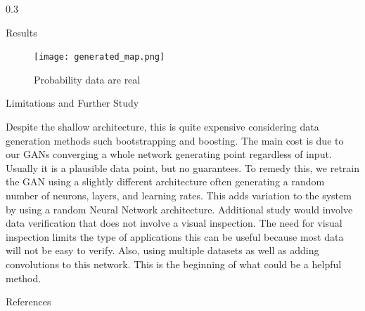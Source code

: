 \documentclass{msuposter}
\newcommand{\colwidth}{0.3\linewidth}
\begin{document}
\begin{frame}{}
\begin{columns}[t]
\begin{column}{\colwidth}
\begin{block}{Results}
\begin{figure}
  \texttt{[image: generated\_map.png]}
  	\caption{\label{fig:my-label} Probability data are real}
\end{figure} 


\end{block}


\begin{block}{Limitations and Further Study}

Despite the shallow architecture, this is quite expensive considering data generation methods such bootstrapping and boosting. The main cost is due to our GANs converging a whole network generating point regardless of input. Usually it is a plausible data point, but no guarantees. To remedy this, we retrain the GAN using a slightly different architecture often generating a random number of neurons, layers, and learning rates. This adds variation to the system by using a random Neural Network architecture. Additional study would involve data verification that does not involve a visual inspection. The need for visual inspection limits the type of applications this can be useful because most data will not be easy to verify. Also, using multiple datasets as well as adding convolutions to this network. This is the beginning of what could be a helpful method. 

\end{block}


\begin{block}{References}
\scriptsize


\end{block}


\end{column}

\end{columns}
	\end{frame}
\end{document}
